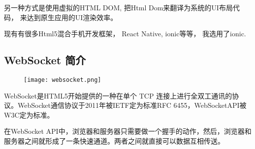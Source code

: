 另一种方式是使用虚拟的HTML DOM, 把Html Dom来翻译为系统的UI布局代码， 来达到原生应用的UI渲染效率。

现有有很多Html5混合手机开发框架， React Native, ionic等等， 我选用了ionic.


\subsection{WebSocket 简介}

\begin{figure}[H]
	\centering
	\texttt{[image: websocket.png]}
	\label{fig: websocket}
\end{figure}

WebSocket是HTML5开始提供的一种在单个 TCP 连接上进行全双工通讯的协议。WebSocket通信协议于2011年被IETF定为标准RFC 6455，WebSocketAPI被W3C定为标准。

在WebSocket API中，浏览器和服务器只需要做一个握手的动作，然后，浏览器和服务器之间就形成了一条快速通道。两者之间就直接可以数据互相传送。